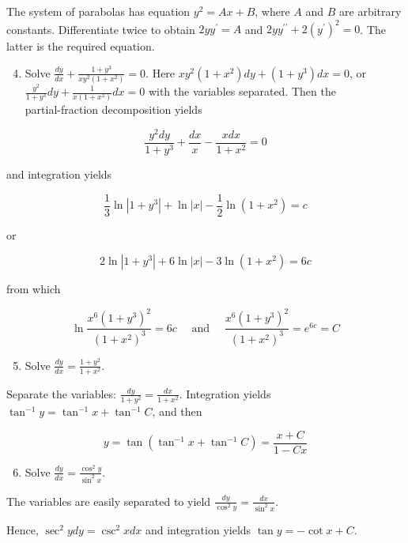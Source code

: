 \documentclass[10pt]{article}
\begin{document}
The system of parabolas has equation $y^{2}=A x+B$, where $A$ and $B$ are arbitrary constants. Differentiate twice to obtain $2 y y^{\prime}=A$ and $2 y y^{\prime \prime}+2\left(y^{\prime}\right)^{2}=0$. The latter is the required equation.

\begin{enumerate}
  \setcounter{enumi}{3}
  \item Solve $\frac{d y}{d x}+\frac{1+y^{3}}{x y^{2}\left(1+x^{2}\right)}=0$. Here $x y^{2}\left(1+x^{2}\right) d y+\left(1+y^{3}\right) d x=0$, or $\frac{y^{2}}{1+y^{3}} d y+\frac{1}{x\left(1+x^{2}\right)} d x=0$ with the variables separated. Then the\\
partial-fraction decomposition yields
\end{enumerate}

$$
\frac{y^{2} d y}{1+y^{3}}+\frac{d x}{x}-\frac{x d x}{1+x^{2}}=0
$$

and integration yields

$$
\frac{1}{3} \ln \left|1+y^{3}\right|+\ln |x|-\frac{1}{2} \ln \left(1+x^{2}\right)=c
$$

or

$$
2 \ln \left|1+y^{3}\right|+6 \ln |x|-3 \ln \left(1+x^{2}\right)=6 c
$$

from which

$$
\ln \frac{x^{6}\left(1+y^{3}\right)^{2}}{\left(1+x^{2}\right)^{3}}=6 c \quad \text { and } \quad \frac{x^{6}\left(1+y^{3}\right)^{2}}{\left(1+x^{2}\right)^{3}}=e^{6 c}=C
$$

\begin{enumerate}
  \setcounter{enumi}{4}
  \item Solve $\frac{d y}{d x}=\frac{1+y^{2}}{1+x^{2}}$.
\end{enumerate}

Separate the variables: $\frac{d y}{1+y^{2}}=\frac{d x}{1+x^{2}}$. Integration yields $\tan ^{-1} y=\tan ^{-1} x+\tan ^{-1} C$, and then

$$
y=\tan \left(\tan ^{-1} x+\tan ^{-1} C\right)=\frac{x+C}{1-C x}
$$

\begin{enumerate}
  \setcounter{enumi}{5}
  \item Solve $\frac{d y}{d x}=\frac{\cos ^{2} y}{\sin ^{2} x}$.
\end{enumerate}

The variables are easily separated to yield $\frac{d y}{\cos ^{2} y}=\frac{d x}{\sin ^{2} x}$.

Hence, $\sec ^{2} y d y=\csc ^{2} x d x$ and integration yields $\tan y=-\cot x+C$.
\end{document}
